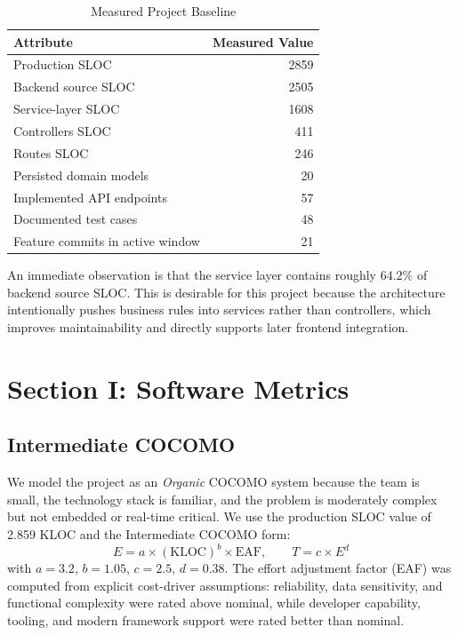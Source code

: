 \documentclass[conference]{IEEEtran}
\begin{document}
\begin{table}[htbp]
\caption{Measured Project Baseline}
\centering
\footnotesize
\begin{tabular}{|l|r|}
\hline
\rowcolor{HeaderBlue}
\textbf{Attribute} & \textbf{Measured Value} \\
\hline
Production SLOC & 2859 \\
Backend source SLOC & 2505 \\
Service-layer SLOC & 1608 \\
Controllers SLOC & 411 \\
Routes SLOC & 246 \\
Persisted domain models & 20 \\
Implemented API endpoints & 57 \\
Documented test cases & 48 \\
Feature commits in active window & 21 \\
\hline
\end{tabular}
\label{tab:baseline}
\end{table}

An immediate observation is that the service layer contains roughly \(64.2\%\) of backend source SLOC. This is desirable for this project because the architecture intentionally pushes business rules into services rather than controllers, which improves maintainability and directly supports later frontend integration.

\section{Section I: Software Metrics}
\subsection{Intermediate COCOMO}
We model the project as an \textit{Organic} COCOMO system because the team is small, the technology stack is familiar, and the problem is moderately complex but not embedded or real-time critical. We use the production SLOC value of 2.859 KLOC and the Intermediate COCOMO form:
\[
E = a \times (\text{KLOC})^b \times \text{EAF}, \qquad
T = c \times E^d
\]
with \(a = 3.2\), \(b = 1.05\), \(c = 2.5\), \(d = 0.38\). The effort adjustment factor (EAF) was computed from explicit cost-driver assumptions: reliability, data sensitivity, and functional complexity were rated above nominal, while developer capability, tooling, and modern framework support were rated better than nominal.
\end{document}
